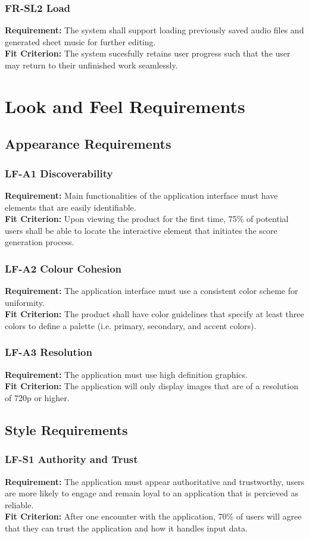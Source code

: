 \documentclass[12pt]{article}
\begin{document}
\subsubsection*{FR-SL2 Load}
\textbf{Requirement:} The system shall support loading previously saved audio files and generated sheet music for further editing. \\
\textbf{Fit Criterion:} The system sucesfully retains user progress such that the user may return to their unfinished work seamlessly.


\section{Look and Feel Requirements}
\subsection{Appearance Requirements}
\subsubsection*{LF-A1 Discoverability}
\textbf{Requirement:} Main functionalities of the application interface must have elements that are easily identifiable.\\
\textbf{Fit Criterion:} Upon viewing the product for the first time, 75\% of potential 
users shall be able to locate the interactive element that initiates the score generation process.
\subsubsection*{LF-A2 Colour Cohesion}
\textbf{Requirement:} The application interface must use a consistent color scheme for uniformity.\\
\textbf{Fit Criterion:} The product shall have color guidelines that specify at least three colors to define a palette 
(i.e. primary, secondary, and accent colors).
\subsubsection*{LF-A3 Resolution}
\textbf{Requirement:} The application must use high definition graphics.\\
\textbf{Fit Criterion:} The application will only display images that are of a resolution of 720p or higher.
\subsection{Style Requirements}
\subsubsection*{LF-S1 Authority and Trust}
\textbf{Requirement:} The application must appear authoritative and trustworthy, users are more likely to engage
and remain loyal to an application that is percieved as reliable.\\
\textbf{Fit Criterion:} After one encounter with the application, 70\% of users will agree 
that they can trust the application and how it handles input data.
\end{document}
